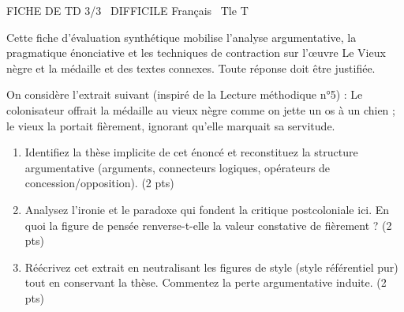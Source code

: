 \documentclass[11pt]{article}
\begin{document}
\begin{tcolorbox}[enhanced,colback=popink,colframe=popink,arc=10pt,boxrule=0pt,left=12pt,right=12pt,top=9pt,bottom=9pt]
{\color{white}\popxbold\small FICHE DE TD 3/3 \textbullet\ DIFFICILE \hfill Français \textbullet\ Tle T\par}
\end{tcolorbox}
\vspace{4pt}
\noindent Cette fiche d'évaluation synthétique mobilise l'analyse argumentative, la pragmatique énonciative et les techniques de contraction sur l'œuvre \og Le Vieux nègre et la médaille \fg{} et des textes connexes. Toute réponse doit être justifiée.

\begin{exercice}
On considère l'extrait suivant (inspiré de la Lecture méthodique n°5) : \og Le colonisateur offrait la médaille au vieux nègre comme on jette un os à un chien ; le vieux la portait fièrement, ignorant qu'elle marquait sa servitude. \fg{}

\begin{enumerate}
    \item Identifiez la thèse implicite de cet énoncé et reconstituez la structure argumentative (arguments, connecteurs logiques, opérateurs de concession/opposition). (2 pts)
    \item Analysez l'ironie et le paradoxe qui fondent la critique postcoloniale ici. En quoi la figure de pensée renverse-t-elle la valeur constative de \og fièrement \fg{} ? (2 pts)
    \item Réécrivez cet extrait en neutralisant les figures de style (style référentiel pur) tout en conservant la thèse. Commentez la perte argumentative induite. (2 pts)
\end{enumerate}
\end{exercice}
\end{document}
